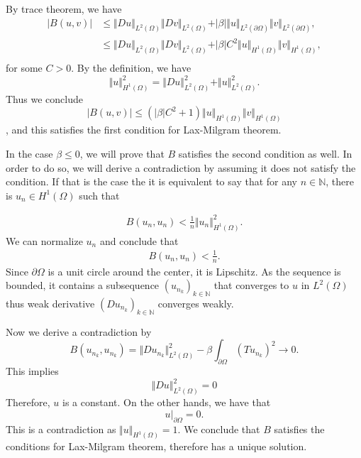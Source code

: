 \documentclass{article}
\begin{document}
By trace theorem, we have
\begin{align*}
|B(u,v)| &\leq \Vert Du\Vert_{L^2(\Omega)}\Vert Dv\Vert_{L^2(\Omega)}+\vert\beta\vert\Vert u\Vert_{L^2(\partial\Omega)}\Vert v\Vert_{L^2(\partial\Omega)},\\
&\leq \Vert Du\Vert_{L^2(\Omega)}\Vert Dv\Vert_{L^2(\Omega)}+\vert\beta\vert C^2\Vert u\Vert_{H^1(\Omega)}\Vert v\Vert_{H^1(\Omega)},\\
\end{align*}
for some $C>0$. By the definition, we have
\begin{equation*}
\Vert u\Vert_{H^1(\Omega)}^2 = \Vert Du\Vert_{L^2(\Omega)}^2+\Vert u\Vert_{L^2(\Omega)}^2.
\end{equation*}
Thus we conclude
\begin{equation*}
|B(u,v)|\leq (\vert\beta\vert C^2+1)\Vert u\Vert_{H^1(\Omega)}\Vert v\Vert_{H^1(\Omega)}
\end{equation*}
, and this satisfies the first condition for Lax-Milgram theorem.\\

\par In the case $\beta\leq 0$, we will prove that $B$ satisfies the second condition as well. In order to do so, we will derive a contradiction by assuming it does not satisfy the condition. If that is the case the it is equivalent to say that for any $n\in\mathbb{N}$, there is $u_n\in H^1(\Omega)$ such that

\begin{align*}
B(u_n,u_n)<{\frac 1 n}\Vert u_n\Vert_{H^1(\Omega)}^2.
\end{align*}
We can normalize $u_n$ and conclude that 
\begin{align*}
B(u_n,u_n)<{\frac 1 n}.
\end{align*}
Since $\partial \Omega$ is a unit circle around the center, it is Lipschitz. As the sequence is bounded, it contains a subsequence $(u_{n_k})_{k\in\mathbb{N}}$ that converges to $u$ in $L^2(\Omega)$ thus weak derivative $(Du_{n_k})_{k\in\mathbb{N}}$ converges weakly.\\
\par Now we derive a contradiction by 
\begin{equation*}
B(u_{n_k},u_{n_k}) = \Vert Du_{n_k}\Vert^2_{L^2(\Omega)}-\beta\int_{\partial\Omega} (Tu_{n_k})^2\to 0.
\end{equation*} 
This implies
\begin{equation*}
 \Vert Du\Vert^2_{L^2(\Omega)}=0
\end{equation*}
Therefore, $u$ is a constant. On the other hands, we have that
\begin{equation*}
u|_{\partial \Omega}=0.
\end{equation*}
This is a contradiction as $\Vert u\Vert_{H^1(\Omega)}=1$. We conclude that $B$ satisfies the conditions for Lax-Milgram theorem, therefore has a unique solution.
\end{document}

